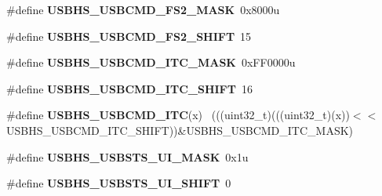 \begin{DoxyCompactItemize}
\item 
\hypertarget{group___u_s_b_h_s___register___masks_gae27e389ecd251f26d0c9d47ae5fab0d4}{}\#define {\bfseries U\+S\+B\+H\+S\+\_\+\+U\+S\+B\+C\+M\+D\+\_\+\+F\+S2\+\_\+\+M\+A\+S\+K}~0x8000u\label{group___u_s_b_h_s___register___masks_gae27e389ecd251f26d0c9d47ae5fab0d4}

\item 
\hypertarget{group___u_s_b_h_s___register___masks_ga1ae96837ffb838336b2df317a42261f9}{}\#define {\bfseries U\+S\+B\+H\+S\+\_\+\+U\+S\+B\+C\+M\+D\+\_\+\+F\+S2\+\_\+\+S\+H\+I\+F\+T}~15\label{group___u_s_b_h_s___register___masks_ga1ae96837ffb838336b2df317a42261f9}

\item 
\hypertarget{group___u_s_b_h_s___register___masks_gab478cb0e3b8f3af50ade7e8d847cebba}{}\#define {\bfseries U\+S\+B\+H\+S\+\_\+\+U\+S\+B\+C\+M\+D\+\_\+\+I\+T\+C\+\_\+\+M\+A\+S\+K}~0x\+F\+F0000u\label{group___u_s_b_h_s___register___masks_gab478cb0e3b8f3af50ade7e8d847cebba}

\item 
\hypertarget{group___u_s_b_h_s___register___masks_ga665d7a35a1b69b3c9c4f9ed78c2676ab}{}\#define {\bfseries U\+S\+B\+H\+S\+\_\+\+U\+S\+B\+C\+M\+D\+\_\+\+I\+T\+C\+\_\+\+S\+H\+I\+F\+T}~16\label{group___u_s_b_h_s___register___masks_ga665d7a35a1b69b3c9c4f9ed78c2676ab}

\item 
\hypertarget{group___u_s_b_h_s___register___masks_gad2d85d770109bc4166ef026369669944}{}\#define {\bfseries U\+S\+B\+H\+S\+\_\+\+U\+S\+B\+C\+M\+D\+\_\+\+I\+T\+C}(x)                                        ~(((uint32\+\_\+t)(((uint32\+\_\+t)(x))$<$$<$U\+S\+B\+H\+S\+\_\+\+U\+S\+B\+C\+M\+D\+\_\+\+I\+T\+C\+\_\+\+S\+H\+I\+F\+T))\&U\+S\+B\+H\+S\+\_\+\+U\+S\+B\+C\+M\+D\+\_\+\+I\+T\+C\+\_\+\+M\+A\+S\+K)\label{group___u_s_b_h_s___register___masks_gad2d85d770109bc4166ef026369669944}

\item 
\hypertarget{group___u_s_b_h_s___register___masks_ga7f49320d7c6fae360cf3623f3720b4c0}{}\#define {\bfseries U\+S\+B\+H\+S\+\_\+\+U\+S\+B\+S\+T\+S\+\_\+\+U\+I\+\_\+\+M\+A\+S\+K}~0x1u\label{group___u_s_b_h_s___register___masks_ga7f49320d7c6fae360cf3623f3720b4c0}

\item 
\hypertarget{group___u_s_b_h_s___register___masks_ga9ceb6f6096fb8daa682ccaf38baa229b}{}\#define {\bfseries U\+S\+B\+H\+S\+\_\+\+U\+S\+B\+S\+T\+S\+\_\+\+U\+I\+\_\+\+S\+H\+I\+F\+T}~0\label{group___u_s_b_h_s___register___masks_ga9ceb6f6096fb8daa682ccaf38baa229b}


\end{DoxyCompactItemize}
